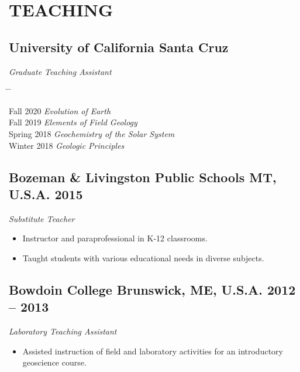 \documentclass[10pt]{article}
\begin{document}
\section*{TEACHING}

\subsection*{\textbf{University of California Santa Cruz}}
\textit{Graduate Teaching Assistant}
\begin{tabbing} \hspace{10pt} \= \hspace{2.5cm} \=  \kill

\> Fall 2020 \> \textit{Evolution of Earth}\\
\> Fall 2019 \> \textit{Elements of Field Geology}\\
\> Spring 2018 \>  \textit{Geochemistry of the Solar System}\\
\> Winter 2018 \> \textit{Geologic Principles}

\end{tabbing}

\subsection*{\textbf{Bozeman \& Livingston Public Schools} \hspace{15pt} MT, U.S.A. \hfill 2015}
\textit{Substitute Teacher}
\begin{itemize}
	\item Instructor and paraprofessional in K-12 classrooms.
	\item Taught students with various educational needs in diverse subjects.
\end{itemize}

\subsection*{\textbf{Bowdoin College} \hspace{15pt} Brunswick, ME, U.S.A. \hfill 2012 – 2013}
\textit{Laboratory Teaching Assistant}
\begin{itemize}
	\item Assisted instruction of field and laboratory activities for an introductory geoscience course.
\end{itemize}

\end{document}
